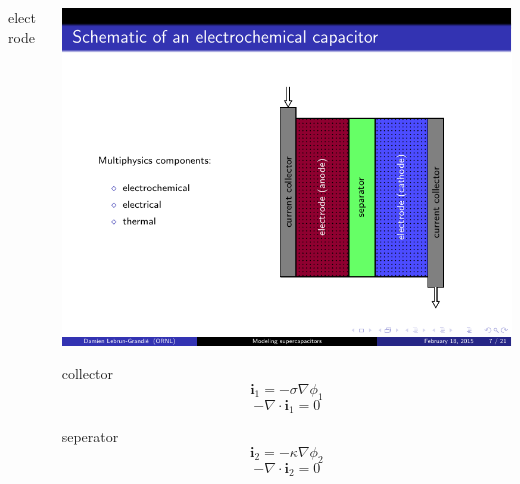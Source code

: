 \documentclass[10pt,xcolor=dvipsnames,compress]{beamer}
\begin{document}
\begin{frame}
\begin{columns}
\begin{column}{.65\textwidth}
\begin{block}{electrode}
\end{block}
\end{column}
\begin{column}{.30\textwidth} 
\begin{center}
\includegraphics[trim = 2.4in 0.42in 0.7in 0.9in, clip, width=.7\textwidth]{figs/supercap_schematic.pdf}  
\end{center}
\begin{block}{collector}
\begin{equation*}
\mathbf{i}_1 = -\sigma\nabla\phi_1
\end{equation*}
\begin{equation*}
-\nabla \cdot \mathbf{i}_1 = 0
\end{equation*}
\end{block}
\begin{block}{seperator}
\begin{equation*}
\mathbf{i}_2 = -\kappa\nabla\phi_2
\end{equation*}
\begin{equation*}
-\nabla \cdot \mathbf{i}_2 = 0
\end{equation*}
\end{block}
\end{column}
\end{columns}


\vfill
\end{frame}
\end{document}
